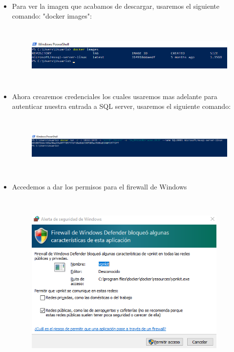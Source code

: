 \begin{itemize}
	\item Para ver la imagen que acabamos de descargar, usaremos el siguiente comando: "docker images":\\
	
	
	\begin{figure}[htb]
	\begin{center}
	\includegraphics[width=16cm, height=3cm]{./Imagenes/dockerimages}
	\end{center}
	\end{figure}
	
	\item Ahora crearemos credenciales los cuales usaremos mas adelante para autenticar nuestra entrada a SQL server, usaremos el siguiente comando: 
	
	
	\begin{figure}[htb]
	\begin{center}
	\includegraphics[width=16cm, height=3cm]{./Imagenes/dockercred}
	\end{center}
	\end{figure}
	
	\item Accedemos a dar los permisos para el firewall de Windows
	
	\begin{figure}[htb]
	\begin{center}
	\includegraphics[width=10cm, height=9cm]{./Imagenes/firewall}
	\end{center}
	\end{figure}
	

\end{itemize}
